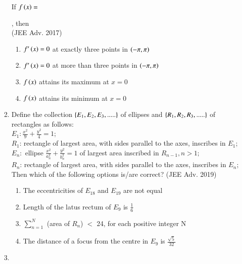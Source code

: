 \documentclass[journal]{IEEEtran}
\begin{document}
\begin{enumerate}
{            If $f\left(x\right) = $
            
            , then \\
            \text{   } \hfill
                {(JEE Adv. 2017)}
            \begin{enumerate}
                    \item $f^{\prime}\left(x\right) = 0$ at exactly three points in $\left(-\pi,\pi\right)$
                    \item $f^{\prime}\left(x\right) = 0$ at more than three points in $\left(-\pi,\pi\right)$
                    \item $f\left(x\right)$ attains its maximum at $x=0$
                    \item $f\left(x\right)$ attains its minimum at $x=0$
            \end{enumerate}
        
        }
    \item{
        
            Define the collection $\left\{E_1, E_2, E_3, .....\right\}$ of ellipses and $\left\{R_1, R_2, R_3, .....\right\}$ of rectangles as follows:\\[6pt]
            $E_1 : \frac{x^2}{9}+ \frac{y^2}{4} = 1$;\\[6pt]
            $R_1$: rectangle of largest area, with sides parallel to the axes, inscribes in $E_1$;\\[6pt]
            $E_n : $ ellipse $\frac{x^2}{a_n^2}+ \frac{y^2}{b_n^2} = 1$ of largest area inscribed in $R_{n-1}, n>1;$\\[6pt]
            $R_n$: rectangle of largest area, with sides parallel to the axes, inscribes in $E_n$;\\ Then which of the following options is/are correct?
             \hfill
                {(JEE Adv. 2019)}
            
            \begin{enumerate}
                \item The eccentricities of $E_{18}$ and $E_{19}$ are not equal
                \item Length of the latus rectum of $E_{9}$ is $\frac{1}{6}$
                \item $\sum_{n=1}^N$ (area of $R_n$) $<$ 24, for each positive integer N
                \item The distance of a focus from the centre in $E_9$ is $\frac{\sqrt{5}}{32}$
            \end{enumerate}
        
        }
    \item{
        
}
\end{enumerate}
\end{document}
